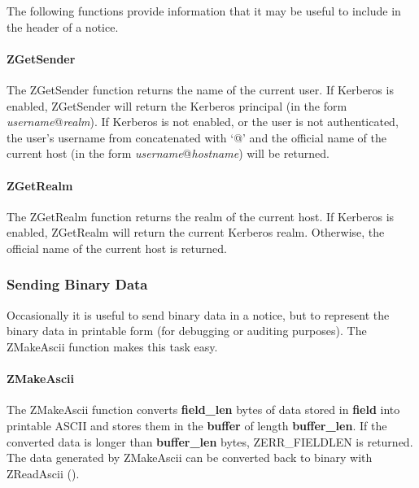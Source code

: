 The following functions provide information that it may be useful to
include in the header of a notice.

\paragraph{ZGetSender}
\label{ZGetSender}

\etemplate
{}

The ZGetSender function returns the name of the current user.  If
Kerberos is enabled, ZGetSender will return the Kerberos principal (in
the form {\em username\/}@{\em realm\/}).  If Kerberos is not enabled,
or the user is not authenticated, the user's username from
 concatenated with `@' and the official name of
the current host (in the form {\em username\/}@{\em hostname\/}) will be
returned.

\paragraph{ZGetRealm}
\label{ZGetRealm}

\etemplate
{}

The ZGetRealm function returns the realm of the current host.  If
Kerberos is enabled, ZGetRealm will return the current Kerberos realm.
Otherwise, the official name of the current host is returned.

\subsubsection{Sending Binary Data}

Occasionally it is useful to send binary data in a notice, but to
represent the binary data in printable form (for debugging or auditing
purposes).  The ZMakeAscii function makes this task easy.

\paragraph{ZMakeAscii}
\label{ZMakeAscii}

\etemplate
{}

The ZMakeAscii function converts {\bf field_len} bytes of data
stored in {\bf field} into printable ASCII and stores them in the {\bf
buffer} of length {\bf buffer_len}.  If the converted data is longer
than {\bf buffer_len} bytes, ZERR_FIELDLEN is returned.  The
data generated by ZMakeAscii can be converted back to binary with
ZReadAscii ().

